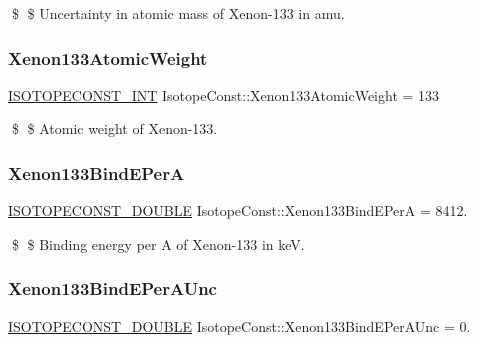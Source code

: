 \$ \$ Uncertainty in atomic mass of Xenon-\/133 in amu. \mbox{\label{group___isotope_const-_xenon-_xe133_ga3973b866c1d0907124c292b8f1f1c8be}} 
\subsubsection{\texorpdfstring{Xenon133\+Atomic\+Weight}{Xenon133AtomicWeight}}
{\footnotesize\ttfamily \mbox{\hyperlink{group___isotope_const-_macros_ga5f18360b3e99483a35c32d789e62621c}{I\+S\+O\+T\+O\+P\+E\+C\+O\+N\+S\+T\+\_\+\+I\+NT}} Isotope\+Const\+::\+Xenon133\+Atomic\+Weight = 133}

\$ \$ Atomic weight of Xenon-\/133. \mbox{\label{group___isotope_const-_xenon-_xe133_ga47b5bd436b9c539fd3aa243d3d9e9c89}} 
\subsubsection{\texorpdfstring{Xenon133\+Bind\+E\+PerA}{Xenon133BindEPerA}}
{\footnotesize\ttfamily \mbox{\hyperlink{group___isotope_const-_macros_ga8f45a7272ce02c0b4c65c44636ed719a}{I\+S\+O\+T\+O\+P\+E\+C\+O\+N\+S\+T\+\_\+\+D\+O\+U\+B\+LE}} Isotope\+Const\+::\+Xenon133\+Bind\+E\+PerA = 8412.}

\$ \$ Binding energy per A of Xenon-\/133 in keV. \mbox{\label{group___isotope_const-_xenon-_xe133_ga337993131993574bc3de4aa47418bae9}} 
\subsubsection{\texorpdfstring{Xenon133\+Bind\+E\+Per\+A\+Unc}{Xenon133BindEPerAUnc}}
{\footnotesize\ttfamily \mbox{\hyperlink{group___isotope_const-_macros_ga8f45a7272ce02c0b4c65c44636ed719a}{I\+S\+O\+T\+O\+P\+E\+C\+O\+N\+S\+T\+\_\+\+D\+O\+U\+B\+LE}} Isotope\+Const\+::\+Xenon133\+Bind\+E\+Per\+A\+Unc = 0.}

